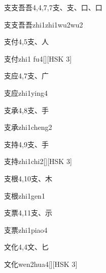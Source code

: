 \begin{entry}{支支吾吾}{4,4,7,7}{⽀、⽀、⼝、⼝}
  \begin{phonetics}{支支吾吾}{zhi1zhi1wu2wu2}
  \end{phonetics}
\end{entry}

\begin{entry}{支付}{4,5}{⽀、⼈}
  \begin{phonetics}{支付}{zhi1 fu4}[][HSK 3]
  \end{phonetics}
\end{entry}

\begin{entry}{支应}{4,7}{⽀、⼴}
  \begin{phonetics}{支应}{zhi1ying4}
  \end{phonetics}
\end{entry}

\begin{entry}{支承}{4,8}{⽀、⼿}
  \begin{phonetics}{支承}{zhi1cheng2}
  \end{phonetics}
\end{entry}

\begin{entry}{支持}{4,9}{⽀、⼿}
  \begin{phonetics}{支持}{zhi1chi2}[][HSK 3]
  \end{phonetics}
\end{entry}

\begin{entry}{支根}{4,10}{⽀、⽊}
  \begin{phonetics}{支根}{zhi1gen1}
  \end{phonetics}
\end{entry}

\begin{entry}{支票}{4,11}{⽀、⽰}
  \begin{phonetics}{支票}{zhi1piao4}
  \end{phonetics}
\end{entry}

\begin{entry}{文化}{4,4}{⽂、⼔}
  \begin{phonetics}{文化}{wen2hua4}[][HSK 3]
  \end{phonetics}
\end{entry}

